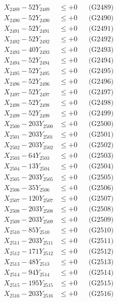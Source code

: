 \documentclass[a4paper,10pt]{article}
\begin{document}
{\begin{align}
X_{2489} - 52Y_{2489} &\leq +0 && \text{(G2489)} \\
X_{2490} - 52Y_{2490} &\leq +0 && \text{(G2490)} \\
\allowbreak
X_{2491} - 52Y_{2491} &\leq +0 && \text{(G2491)} \\
X_{2492} - 52Y_{2492} &\leq +0 && \text{(G2492)} \\
X_{2493} - 40Y_{2493} &\leq +0 && \text{(G2493)} \\
X_{2494} - 52Y_{2494} &\leq +0 && \text{(G2494)} \\
X_{2495} - 52Y_{2495} &\leq +0 && \text{(G2495)} \\
X_{2496} - 52Y_{2496} &\leq +0 && \text{(G2496)} \\
X_{2497} - 52Y_{2497} &\leq +0 && \text{(G2497)} \\
X_{2498} - 52Y_{2498} &\leq +0 && \text{(G2498)} \\
X_{2499} - 52Y_{2499} &\leq +0 && \text{(G2499)} \\
X_{2500} - 203Y_{2500} &\leq +0 && \text{(G2500)} \\
\allowbreak
X_{2501} - 203Y_{2501} &\leq +0 && \text{(G2501)} \\
X_{2502} - 203Y_{2502} &\leq +0 && \text{(G2502)} \\
X_{2503} - 64Y_{2503} &\leq +0 && \text{(G2503)} \\
X_{2504} - 13Y_{2504} &\leq +0 && \text{(G2504)} \\
X_{2505} - 203Y_{2505} &\leq +0 && \text{(G2505)} \\
X_{2506} - 35Y_{2506} &\leq +0 && \text{(G2506)} \\
X_{2507} - 120Y_{2507} &\leq +0 && \text{(G2507)} \\
X_{2508} - 203Y_{2508} &\leq +0 && \text{(G2508)} \\
X_{2509} - 203Y_{2509} &\leq +0 && \text{(G2509)} \\
X_{2510} - 85Y_{2510} &\leq +0 && \text{(G2510)} \\
\allowbreak
X_{2511} - 203Y_{2511} &\leq +0 && \text{(G2511)} \\
X_{2512} - 171Y_{2512} &\leq +0 && \text{(G2512)} \\
X_{2513} - 48Y_{2513} &\leq +0 && \text{(G2513)} \\
X_{2514} - 94Y_{2514} &\leq +0 && \text{(G2514)} \\
X_{2515} - 195Y_{2515} &\leq +0 && \text{(G2515)} \\
X_{2516} - 203Y_{2516} &\leq +0 && \text{(G2516)} \\

\end{align}}
\end{document}
